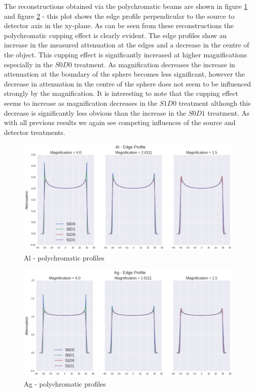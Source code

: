 \documentclass[
  twoside,
  11pt, a4paper,
  footinclude=true,
  headinclude=true,
  cleardoublepage=empty
]{scrbook}
\begin{document}
The reconstructions obtained via the polychromatic beams are shown in figure \ref{polyal} and figure \ref{polyag} - this plot shows the edge profile perpendicular to the source to detector axis in the xy-plane. As can be seen from these reconstructions the polychromatic cupping effect is clearly evident. The edge profiles show an increase in the measured attenuation at the edges and a decrease in the centre of the object. This cupping effect is significantly increased at higher magnifications especially in the $S0D0$ treatment. As magnification decreases the increase in attenuation at the boundary of the sphere becomes less significant, however the decrease in attenuation in the centre of the sphere does not seem to be influenced strongly by the magnification. It is interesting to note that the cupping effect seems to increase as magnification decreases in the $S1D0$ treatment although this decrease is significantly less obvious than the increase in the $S0D1$ treatment. As with all previous results we again see competing influences of the source and detector treatments.

\begin{figure}[h!]
  \centering
    \includegraphics[width=\textwidth]{code/Polychromatic/Poly_Profiles_files/Poly_Profiles_3_1.png}
    \caption{Al - polychromatic profiles}
    \label{polyal}
\end{figure}

\begin{figure}[h!]
  \centering
    \includegraphics[width=\textwidth]{code/Polychromatic/Poly_Profiles_files/Poly_Profiles_4_1.png}
    \caption{Ag - polychromatic profiles}
    \label{polyag}
\end{figure}
\end{document}
